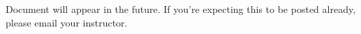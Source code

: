 \documentclass[12pt]{article}
\begin{document}
\quad
\vfill
\begin{center}
\Huge{Document will appear in the future. If you're expecting this to be posted already, please email your instructor.}
\end{center}
\vfill
\end{document}

